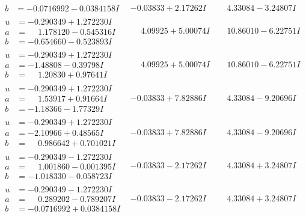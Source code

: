 \documentclass[1p]{elsarticle_modified}
\theoremstyle{definition}
\begin{document}
$$\begin{array}{c|c|c}
\begin{aligned}
b &= -0.0716992 - 0.0384158 I\end{aligned}
 & -0.03833 + 2.17262 I & \phantom{-}4.33084 - 3.24807 I \\ \hline\begin{aligned}
u &= -0.290349 + 1.272230 I \\
a &= \phantom{-}1.178120 - 0.545316 I \\
b &= -0.654660 - 0.523893 I\end{aligned}
 & \phantom{-}4.09925 + 5.00074 I & \phantom{-}10.86010 - 6.22751 I \\ \hline\begin{aligned}
u &= -0.290349 + 1.272230 I \\
a &= -1.48808 - 0.39798 I \\
b &= \phantom{-}1.20830 + 0.97641 I\end{aligned}
 & \phantom{-}4.09925 + 5.00074 I & \phantom{-}10.86010 - 6.22751 I \\ \hline\begin{aligned}
u &= -0.290349 + 1.272230 I \\
a &= \phantom{-}1.53917 + 0.91664 I \\
b &= -1.18366 - 1.77329 I\end{aligned}
 & -0.03833 + 7.82886 I & \phantom{-}4.33084 - 9.20696 I \\ \hline\begin{aligned}
u &= -0.290349 + 1.272230 I \\
a &= -2.10966 + 0.48565 I \\
b &= \phantom{-}0.986642 + 0.701021 I\end{aligned}
 & -0.03833 + 7.82886 I & \phantom{-}4.33084 - 9.20696 I \\ \hline\begin{aligned}
u &= -0.290349 - 1.272230 I \\
a &= \phantom{-}1.001860 - 0.001395 I \\
b &= -1.018330 - 0.058723 I\end{aligned}
 & -0.03833 - 2.17262 I & \phantom{-}4.33084 + 3.24807 I \\ \hline\begin{aligned}
u &= -0.290349 - 1.272230 I \\
a &= \phantom{-}0.289202 - 0.789207 I \\
b &= -0.0716992 + 0.0384158 I\end{aligned}
 & -0.03833 - 2.17262 I & \phantom{-}4.33084 + 3.24807 I \\ \hline\begin{aligned}

\end{aligned}
\end{array}$$
\end{document}
